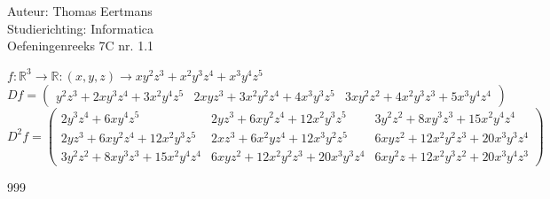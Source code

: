 \documentclass[a4paper]{article}
\begin{document}
  
\noindent \large Auteur: Thomas Eertmans \\
\noindent \large Studierichting: Informatica\\
\noindent \large Oefeningenreeks 7C nr. 1.1\\

\medskip

\normalsize

$f: \mathbb{R}^3 \rightarrow \mathbb{R} : (x,y,z) \rightarrow xy^2z^3+x^2y^3z^4+x^3y^4z^5$ \\

$Df = \left( \begin{array}{ccc}y^2z^3+2xy^3z^4+3x^2y^4z^5 & 2xyz^3+3x^2y^2z^4+4x^3y^3z^5 & 3xy^2z^2+4x^2y^3z^3+5x^3y^4z^4 \end{array}\right)$ \\

$D^2f = \left( \begin{array}{ccc}
	2y^3z^4+6xy^4z^5 & 2yz^3+6xy^2z^4+12x^2y^3z^5 & 3y^2z^2+8xy^3z^3+15x^2y^4z^4 \\
	2yz^3+6xy^2z^4+12x^2y^3z^5 & 2xz^3+6x^2yz^4+12x^3y^2z^5 & 6xyz^2+12x^2y^2z^3+20x^3y^3z^4 \\
	3y^2z^2+8xy^3z^3+15x^2y^4z^4 & 6xyz^2+12x^2y^2z^3+20x^3y^3z^4 & 6xy^2z+12x^2y^3z^2+20x^3y^4z^3
\end{array}\right)$

\begin{thebibliography}{999}
\end{thebibliography}
\end{document}
